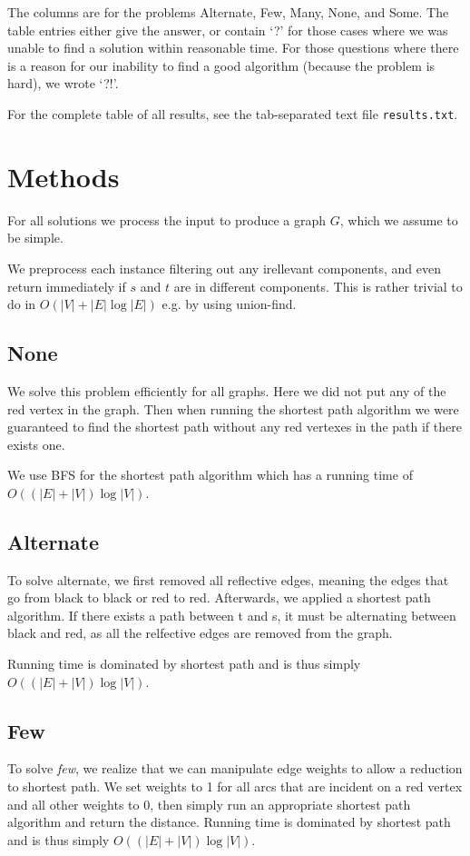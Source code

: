\documentclass{tufte-handout}
\begin{document}
The columns are for the problems Alternate, Few, Many, None, and Some.
The table entries either give the answer, or contain `?' for those cases where we was unable to find a solution within reasonable time.
For those questions where there is a reason for our inability to find a good algorithm (because the problem is hard), we wrote `?!'.

For the complete table of all results, see the tab-separated text file {\tt results.txt}.

\section{Methods}

For all solutions we process the input to produce a graph $G$,
which we assume to be simple.

We preprocess each instance filtering out any irellevant components,
and even return immediately if $s$ and $t$ are in different components.
This is rather trivial to do in $O(|V|+|E| \log |E|)$ e.g. by using union-find.

\subsection{None}
We solve this problem efficiently for all graphs.
Here we did not put any of the red vertex in the graph.
Then when running the shortest path algorithm we were guaranteed
to find the shortest path without any red vertexes in the path
if there exists one.

We use BFS for the shortest path algorithm which has a 
running time of $O((|E| + |V|) \log |V|)$.

\subsection{Alternate}
To solve alternate, we first removed all reflective edges, 
meaning the edges that go from black to black or red to red.
Afterwards, we applied a shortest path algorithm.
If there exists a path between t and s, it must be 
alternating between black and red, as all the relfective edges are removed from the graph.

Running time is dominated by shortest path and is thus simply
$O((|E|+|V|) \log |V|)$.

\subsection{Few}
To solve \textit{few}, 
we realize that we can manipulate edge weights
to allow a reduction to shortest path.
We set weights to 1 for all arcs that 
are incident on a red vertex and all other weights to 0,
then simply run an appropriate shortest path algorithm 
and return the distance.
Running time is dominated by shortest path and is thus simply
$O((|E|+|V|) \log |V|)$.
\end{document}
